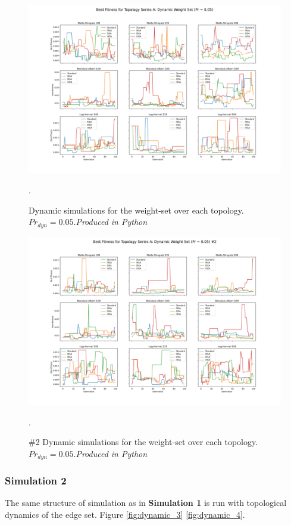 \documentclass[
	a4paper, %
	10pt, %
	unnumberedsections, %
	twoside, %
]{LTJournalArticle}
\begin{document}
\begin{figure}
	\includegraphics[width=\linewidth]{Figures/sims/dynamic/series_a_weight.jpg}
	\caption{Dynamic simulations for the weight-set over each topology. \(Pr_{dyn} = 0.05\).\emph{Produced in Python}}. 
	\label{fig:dynamic_1}
\end{figure}

\begin{figure}
	\includegraphics[width=\linewidth]{Figures/sims/dynamic/series_a_weight_2.jpg}
	\caption{\#2 Dynamic simulations for the weight-set over each topology. \(Pr_{dyn} = 0.05\).\emph{Produced in Python}}. 
	\label{fig:dynamic_2}
\end{figure}

\subsubsection{Simulation 2} The same structure of simulation as in \textbf{Simulation 1} is run with topological dynamics of the edge set. Figure \ref{fig:dynamic_3} \ref{fig:dynamic_4}. 
\end{document}
